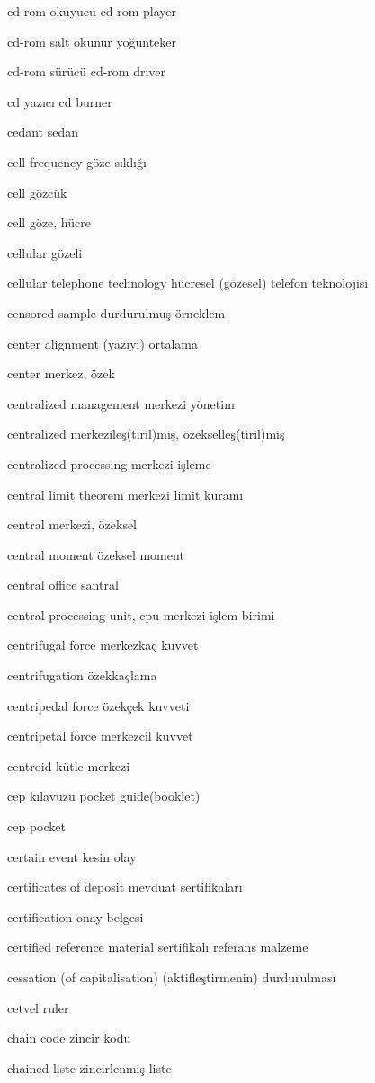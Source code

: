 \documentclass[12pt,fleqn]{article}\usepackage{../../common}
\begin{document}
cd-rom-okuyucu cd-rom-player

cd-rom salt okunur yoğunteker

cd-rom sürücü cd-rom driver

cd yazıcı cd burner

cedant sedan

cell frequency göze sıklığı

cell gözcük

cell göze, hücre

cellular gözeli

cellular telephone technology hücresel (gözesel) telefon teknolojisi

censored sample durdurulmuş örneklem

center alignment (yazıyı) ortalama

center merkez, özek

centralized management merkezi yönetim

centralized merkezileş(tiril)miş, özekselleş(tiril)miş

centralized processing merkezi işleme

central limit theorem merkezi limit kuramı

central merkezi, özeksel

central moment özeksel moment

central office santral

central processing unit, cpu merkezi işlem birimi

centrifugal force merkezkaç kuvvet

centrifugation özekkaçlama

centripedal force özekçek kuvveti

centripetal force merkezcil kuvvet

centroid kütle merkezi

cep kılavuzu pocket guide(booklet)

cep pocket

certain event kesin olay

certificates of deposit mevduat sertifikaları

certification onay belgesi

certified reference material sertifikalı referans malzeme

cessation (of capitalisation) (aktifleştirmenin) durdurulması

cetvel ruler

chain code zincir kodu

chained liste zincirlenmiş liste
\end{document}
